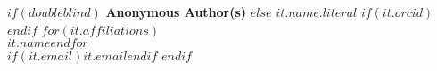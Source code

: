 $if(doubleblind)$
  \textbf{Anonymous Author(s)}
$else$
  \textbf{\normalsize $it.name.literal$} %
  $if(it.orcid)$~$endif$ %
  $for(it.affiliations)$\\{\small $it.name$}$endfor$ %
  \\$if(it.email)$\href{mailto:$it.email$}{\small\textit{$it.email$}}$endif$ %
$endif$
